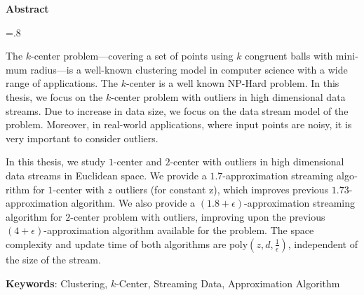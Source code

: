 


\pagestyle{empty}

\begin{latin}

\begin{center}
\textbf{Abstract}
\end{center}
\baselineskip=.8\baselineskip

The $k$-center problem---covering a set of points using $k$ congruent balls with minimum radius---is a well-known clustering model in computer science with a wide range of applications. The $k$-center is a well known NP-Hard problem. In this thesis, we focus on the $k$-center problem with outliers in high dimensional data streams. Due to increase in data size, we focus on the data stream model of the problem. Moreover, in real-world applications, where input points are noisy, it is very important to consider outliers.

In this thesis, we study $1$-center and $2$-center with outliers in high dimensional data streams in Euclidean space. We provide a $1.7$-approximation streaming algorithm for $1$-center with $z$ outliers (for constant z), which improves previous $1.73$-approximation algorithm. We also provide a $(1.8 + \epsilon)$-approximation streaming algorithm for $2$-center problem with outliers, improving upon the previous $(4 + \epsilon)$-approximation algorithm available for the problem. The space complexity and update time of both algorithms are $\text{poly}(z, d, \frac{1}{\epsilon})$, independent of the size of the stream.

\bigskip\noindent\textbf{Keywords}:
Clustering, $k$-Center, Streaming Data, Approximation Algorithm

\end{latin}

\newpage
